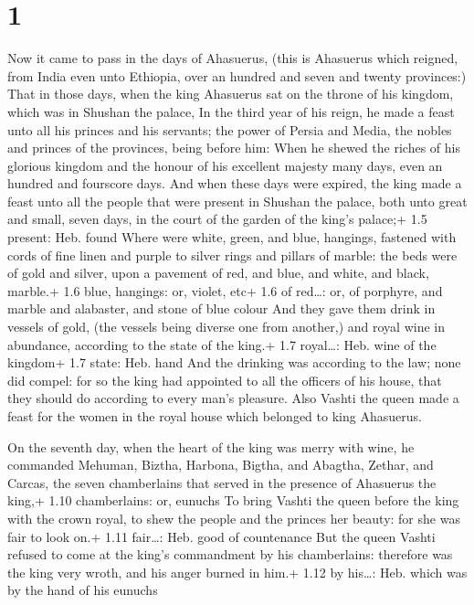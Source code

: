 \hypertarget{section}{%
\section{1}\label{section}}

 Now it came to pass in the days of Ahasuerus, (this is
Ahasuerus which reigned, from India even unto Ethiopia, over an hundred
and seven and twenty provinces:)  That in those days, when
the king Ahasuerus sat on the throne of his kingdom, which was in
Shushan the palace,  In the third year of his reign, he made
a feast unto all his princes and his servants; the power of Persia and
Media, the nobles and princes of the provinces, being before him:
 When he shewed the riches of his glorious kingdom and the
honour of his excellent majesty many days, even an hundred and fourscore
days.  And when these days were expired, the king made a
feast unto all the people that were present in Shushan the palace, both
unto great and small, seven days, in the court of the garden of the
king's palace;+ 1.5 present: Heb. found  Where were white,
green, and blue, hangings, fastened with cords of fine linen and purple
to silver rings and pillars of marble: the beds were of gold and silver,
upon a pavement of red, and blue, and white, and black, marble.+ 1.6
blue, hangings: or, violet, etc+ 1.6 of red\ldots: or, of porphyre, and
marble and alabaster, and stone of blue colour  And they
gave them drink in vessels of gold, (the vessels being diverse one from
another,) and royal wine in abundance, according to the state of the
king.+ 1.7 royal\ldots: Heb. wine of the kingdom+ 1.7 state: Heb. hand
 And the drinking was according to the law; none did compel:
for so the king had appointed to all the officers of his house, that
they should do according to every man's pleasure.  Also
Vashti the queen made a feast for the women in the royal house which
belonged to king Ahasuerus.

 On the seventh day, when the heart of the king was merry
with wine, he commanded Mehuman, Biztha, Harbona, Bigtha, and Abagtha,
Zethar, and Carcas, the seven chamberlains that served in the presence
of Ahasuerus the king,+ 1.10 chamberlains: or, eunuchs  To
bring Vashti the queen before the king with the crown royal, to shew the
people and the princes her beauty: for she was fair to look on.+ 1.11
fair\ldots: Heb. good of countenance  But the queen Vashti
refused to come at the king's commandment by his chamberlains: therefore
was the king very wroth, and his anger burned in him.+ 1.12 by
his\ldots: Heb. which was by the hand of his eunuchs

